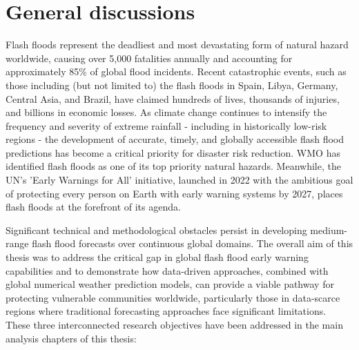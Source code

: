 \chapter{General discussions}
\label{general_discussions}
\graphicspath{{chapter_08/figures}{chapter_08/tables}}


Flash  floods represent the deadliest and most devastating form of natural hazard worldwide, causing over 5,000 fatalities annually and accounting for approximately 85\% of global flood incidents. Recent catastrophic events, such as those including (but not limited to) the flash floods in Spain, Libya, Germany, Central Asia, and Brazil, have claimed hundreds of lives, thousands of injuries, and billions in economic losses. As climate change continues to intensify the frequency and severity of extreme rainfall - including in historically low-risk regions - the development of accurate, timely, and globally accessible flash flood predictions has become a critical priority for disaster risk reduction. WMO has identified flash floods as one of its top priority natural hazards. Meanwhile, the UN's 'Early Warnings for All' initiative, launched in 2022 with the ambitious goal of protecting every person on Earth with early warning systems by 2027, places flash floods at the forefront of its agenda.

Significant  technical and methodological obstacles persist in developing medium-range flash flood forecasts over continuous global domains. The overall aim of this thesis was to address the critical gap in global flash flood early warning capabilities and to demonstrate how data-driven approaches, combined with global numerical weather prediction models, can provide a viable pathway for protecting vulnerable communities worldwide, particularly those in data-scarce regions where traditional forecasting approaches face significant limitations. These three interconnected research objectives have been addressed in the main analysis chapters of this thesis:

